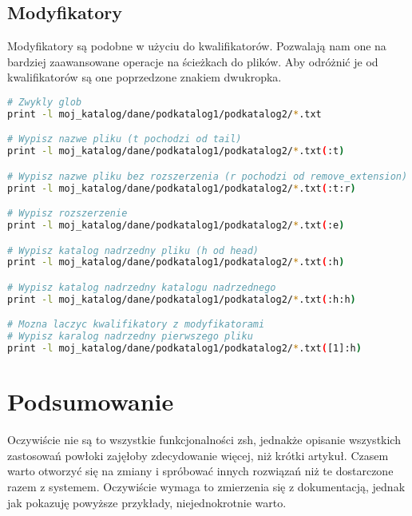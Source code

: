 \documentclass[a4paper]{article}
\begin{document}
\subsection{Modyfikatory}
Modyfikatory są podobne w użyciu do kwalifikatorów. Pozwalają nam one na bardziej zaawansowane operacje na ścieżkach do plików. Aby odróżnić je od kwalifikatorów są one poprzedzone znakiem dwukropka.

\begin{lstlisting}[language=bash]
# Zwykly glob
print -l moj_katalog/dane/podkatalog1/podkatalog2/*.txt

# Wypisz nazwe pliku (t pochodzi od tail)
print -l moj_katalog/dane/podkatalog1/podkatalog2/*.txt(:t)

# Wypisz nazwe pliku bez rozszerzenia (r pochodzi od remove_extension)
print -l moj_katalog/dane/podkatalog1/podkatalog2/*.txt(:t:r)

# Wypisz rozszerzenie
print -l moj_katalog/dane/podkatalog1/podkatalog2/*.txt(:e)

# Wypisz katalog nadrzedny pliku (h od head)
print -l moj_katalog/dane/podkatalog1/podkatalog2/*.txt(:h)

# Wypisz katalog nadrzedny katalogu nadrzednego
print -l moj_katalog/dane/podkatalog1/podkatalog2/*.txt(:h:h)

# Mozna laczyc kwalifikatory z modyfikatorami
# Wypisz karalog nadrzedny pierwszego pliku
print -l moj_katalog/dane/podkatalog1/podkatalog2/*.txt([1]:h)
\end{lstlisting}

\section{Podsumowanie}

Oczywiście nie są to wszystkie funkcjonalności zsh, jednakże opisanie wszystkich zastosowań powłoki zajęłoby zdecydowanie więcej, niż krótki artykuł. Czasem warto otworzyć się na zmiany i spróbować innych rozwiązań niż te dostarczone razem z systemem. Oczywiście wymaga to zmierzenia się z dokumentacją, jednak jak pokazuję powyższe przykłady, niejednokrotnie warto.
\end{document}
